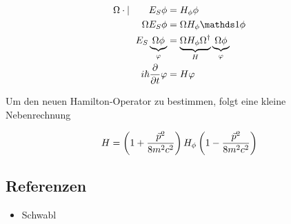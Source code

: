 \begin{align}
  \label{eq:41}
  \Omega\cdot|\qquad E_S \phi &= H_\phi \phi \notag\\
\Omega E_S \phi &= \Omega H_\phi \mathds 1 \phi \notag\\
E_S  \underbr{\Omega  \phi}_{\varphi} &= \underbr{\Omega H_\phi \Omega^\dagger}_{H} \underbr{\Omega  \phi}_{\varphi} \notag\\
i\hbar\pdiff_t \varphi &= H\varphi
\end{align}

Um den neuen Hamilton-Operator zu bestimmen, folgt eine kleine Nebenrechnung

\begin{align}
  \label{eq:43}
  H = \left(1 + \frac{\vec p^2}{8m^2c^2} \right) H_\phi \left(1 - \frac{\vec p^2}{8m^2c^2} \right) \notag\\
\end{align}


\subsection*{Referenzen}
\begin{itemize}
\item Schwabl
\end{itemize}


